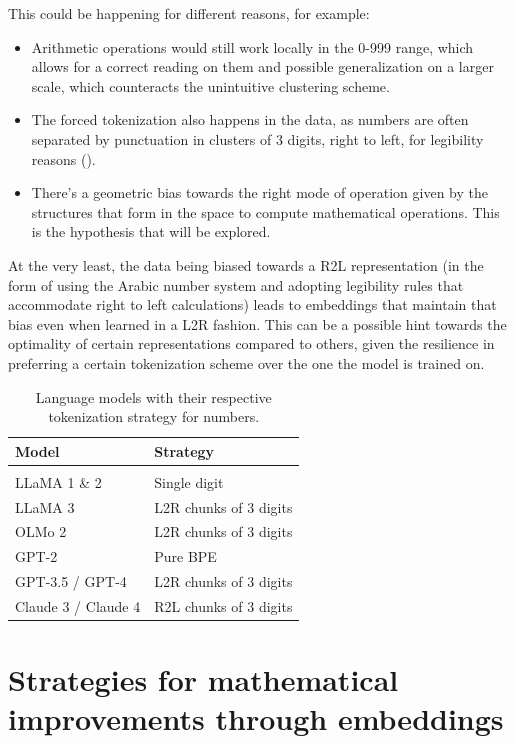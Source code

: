 \documentclass[
  a4paper, twoside, 10pt, titlepage]{book}
\begin{document}
This could be happening for different reasons, for example:

\begin{itemize}
\item
  Arithmetic operations would still work locally in the 0-999 range,
  which allows for a correct reading on them and possible generalization
  on a larger scale, which counteracts the unintuitive clustering
  scheme.
\item
  The forced tokenization also happens in the data, as numbers are often
  separated by punctuation in clusters of 3 digits, right to left, for
  legibility reasons ().
\item
  There's a geometric bias towards the right mode of operation given by
  the structures that form in the space to compute mathematical
  operations. This is the hypothesis that will be explored.
\end{itemize}

At the very least, the data being biased towards a R2L representation
(in the form of using the Arabic number system and adopting legibility
rules that accommodate right to left calculations) leads to embeddings
that maintain that bias even when learned in a L2R fashion. This can be
a possible hint towards the optimality of certain representations
compared to others, given the resilience in preferring a certain
tokenization scheme over the one the model is trained on.

\begin{longtable}[]{@{}ll@{}}
\toprule\noalign{}
\textbf{Model} & \textbf{Strategy} \\
\midrule\noalign{}
\endhead
\bottomrule\noalign{}
\tabularnewline
\caption{Language models with their respective tokenization strategy for
numbers.}
\endlastfoot
LLaMA 1 \& 2 & Single digit \\
LLaMA 3 & L2R chunks of 3 digits \\
OLMo 2 & L2R chunks of 3 digits \\
GPT-2 & Pure BPE \\
GPT-3.5 / GPT-4 & L2R chunks of 3 digits \\
Claude 3 / Claude 4 & R2L chunks of 3 digits \\
\end{longtable}

\clearpage

\section{Strategies for mathematical improvements through
embeddings}\label{strategies-for-mathematical-improvements-through-embeddings}
\end{document}
